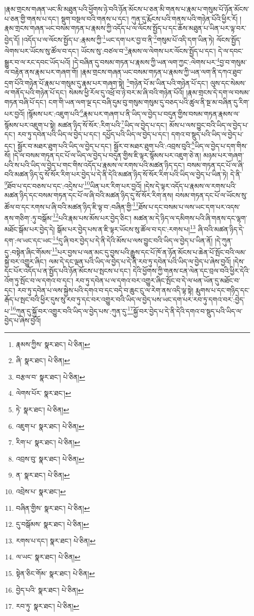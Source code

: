 །རྣམ་གྲངས་གཞན་ཡང་མི་མཐུན་པའི་ཕྱོགས་ཉེ་བའི་ཉོན་མོངས་པ་ཅན་མི་གནས་པ་རྣམ་པ་གསུམ་པོ་ཉོན་མོངས་པ་ཅན་གྱི་གནས་པ་དང་། སྡུག་བསྔལ་བའི་གནས་པ་དང་། ཀུན་དུ་རྨོངས་པའི་གནས་པའི་གཉེན་པོའི་ཕྱིར་རོ། །རྣམ་གྲངས་གཞན་ཡང་བསམ་གཏན་པ་རྣམས་ཀྱི་འདོད་པ་ལ་ལོངས་སྤྱོད་པ་དང་ཆོས་མཐུན་པ་ཡིན་པར་ལྟ་བར་བྱེད་དོ། །འདོད་པ་ལ་ལོངས་སྤྱོད་པ་:རྣམས་ཀྱི་\footnote{རྣམས་ཀྱིས་  སྣར་ཐང་།  པེ་ཅིན། }ཡང་དག་པར་བྱ་བ་ནི་\footnote{ཞི་  སྣར་ཐང་།  པེ་ཅིན། }གསུམ་པོ་འདི་དག་ཡིན་ཏེ། ལོངས་སྤྱོད་ལེགས་པར་ཡོངས་སུ་ཚོལ་བ་དང་། ཡོངས་སུ་:བཙལ་བ་\footnote{བརྩལ་བ་  སྣར་ཐང་།  པེ་ཅིན། }རྣམས་ལ་ལེགས་པར་ལོངས་སྤྱོད་པ་དང་། དེ་ལ་དབང་སྒྱུར་བ་ལ་རང་དབང་ཡོད་པའོ། །དེ་བཞིན་དུ་བསམ་གཏན་པ་རྣམས་ཀྱི་ཡན་ལག་ཀྱང་:ལེགས་པར་\footnote{ལེགས་པོར་  སྣར་ཐང་། }བྱ་བ་གསུམ་ལ་བརྟེན་ནས་རྣམ་པར་གཞག་གོ། །རྣམ་གྲངས་གཞན་ཡང་བསམ་གཏན་པ་རྣམས་ཀྱི་ཡན་ལག་ནི་དཀའ་ཐུབ་དྲག་པོའི་གཉེན་པོ་རྣམ་པ་གསུམ་དུ་རྣམ་པར་གཞག་སྟེ། \footnote{ཏེ་  སྣར་ཐང་།  པེ་ཅིན། }གཉེན་པོ་མ་ཡིན་པའི་གཉེན་པོ་དང་། ལུས་དང་སེམས་ལ་གནོད་པའི་གཉེན་པོ་དང་། སེམས་ཕྱི་རོལ་དུ་འཕྲོ་བ་ཉེ་བར་མ་ཞི་བའི་གཉེན་པོའོ། །རྣམ་གྲངས་དེ་དག་ལ་བསམ་གཏན་བཞི་པོ་དང་། ངག་གི་ཡན་ལག་ལྔ་དང་བཞི་དུམ་བུ་གསུམ་གསུམ་དུ་བཅད་པའི་ཚུལ་ནི་སྔ་མ་བཞིན་དུ་རིག་པར་བྱའོ། །སྙོམས་པར་:འཇུག་པའི་\footnote{འཇུག་པ་  སྣར་ཐང་།  པེ་ཅིན། }རྣམ་པར་གཞག་པ་ནི་ཡིད་ལ་བྱེད་པ་བདུན་གྱིས་བསམ་གཏན་རྣམས་ལ་སྙོམས་པར་འཇུག་པ་སྟེ། མཚན་ཉིད་སོ་སོར་:རིག་པའི་\footnote{རིག་པ་  སྣར་ཐང་།  པེ་ཅིན། }ཡིད་ལ་བྱེད་པ་དང་། མོས་པ་ལས་བྱུང་བའི་ཡིད་ལ་བྱེད་པ་དང་། རབ་ཏུ་དབེན་པའི་ཡིད་ལ་བྱེད་པ་དང་། དཔྱོད་པའི་ཡིད་ལ་བྱེད་པ་དང་། དགའ་བ་སྡུད་པའི་ཡིད་ལ་བྱེད་པ་དང་། སྦྱོར་བ་མཐར་ཐུག་པའི་ཡིད་ལ་བྱེད་པ་དང་། སྦྱོར་བ་མཐར་ཐུག་པའི་:འབྲས་བུའི་\footnote{འབྲས་བུ་  སྣར་ཐང་།  པེ་ཅིན། }ཡིད་ལ་བྱེད་པ་དག་གིས་སོ། །དེ་ལ་བསམ་གཏན་དང་པོ་ལ་ཡིད་ལ་བྱེད་པ་བདུན་གྱིས་ཇི་ལྟར་སྙོམས་པར་འཇུག་ཅེ་ན། མཉམ་པར་གཞག་པའི་ས་པའི་ཡིད་ལ་བྱེད་པ་གང་གིས་འདོད་པ་རྣམས་ལ་རགས་པའི་མཚན་ཉིད་དང་། བསམ་གཏན་དང་པོ་ལ་ཞི་བའི་མཚན་ཉིད་དུ་སོ་སོར་རིག་པར་བྱེད་པ་དེ་ནི་དེའི་མཚན་ཉིད་སོ་སོར་རིག་པའི་ཡིད་ལ་བྱེད་པ་ཡིན་ཏེ། དེ་ནི་\footnote{ན་  སྣར་ཐང་།  པེ་ཅིན། }ཐོབ་པ་དང་བཅས་པ་དང་:འདྲེས་པ་\footnote{འབྲེས་པ་  སྣར་ཐང་། }ཡིན་པར་རིག་པར་བྱའོ། །དེས་དེ་ལྟར་འདོད་པ་རྣམས་ལ་རགས་པའི་མཚན་ཉིད་དང་བསམ་གཏན་དང་པོ་ལ་ཞི་བའི་མཚན་ཉིད་དུ་སོ་སོར་རིག་ནས། བསམ་གཏན་དང་པོ་ལ་ཡོངས་སུ་ཚོལ་བ་དང་རགས་པ་ཞི་བའི་མཚན་ཉིད་ཇི་ལྟ་བ་:བཞིན་གྱི་\footnote{བཞིན་གྱིས་  སྣར་ཐང་།  པེ་ཅིན། }ཐོས་པ་དང་བསམ་པ་ལས་ཡང་དག་པར་འདས་ནས་གཅིག་:ཏུ་བསྒོམ་\footnote{དུ་བསྒོམས་  སྣར་ཐང་།  པེ་ཅིན། }པའི་རྣམ་པས་མོས་པར་བྱེད་ཅིང་། མཚན་མ་དེ་ཉིད་ལ་དམིགས་པའི་ཞི་གནས་དང་ལྷག་མཐོང་སྒོམ་པར་བྱེད་དེ། སྒོམ་པར་བྱེད་པས་ན་ཇི་ལྟར་ཡོངས་སུ་ཚོལ་བ་དང་:རགས་པ།\footnote{རགས་པ་དང་།  སྣར་ཐང་།  པེ་ཅིན། } ཞི་བའི་མཚན་ཉིད་དེ་དག་:ལ་ཡང་དང་ཡང་\footnote{ལ་ཡང་  སྣར་ཐང་།  པེ་ཅིན། }དུ་ཞི་བར་བྱེད་པ་དེ་ནི་དེའི་མོས་པ་ལས་བྱུང་བའི་ཡིད་ལ་བྱེད་པ་ཡིན་ནོ། །དེ་ཀུན་དུ་:བསྟེན་ཞིང་གོམས་\footnote{སྟེན་ཅིང་གོམ་  སྣར་ཐང་།  པེ་ཅིན། }པར་བྱས་པ་ལན་མང་དུ་བྱས་པའི་རྒྱུས་དང་པོ་ཁོ་ན་ཉོན་མོངས་པ་ཆེན་པོ་སྤོང་བའི་ལམ་སྐྱེ་བར་འགྱུར་ཞིང་། ལམ་དེ་དང་ལྡན་པའི་ཡིད་ལ་བྱེད་པ་དེ་ནི་རབ་ཏུ་དབེན་པའི་ཡིད་ལ་བྱེད་པ་ཞེས་བྱའོ། །དེས་དང་པོར་འདོད་པ་ན་སྤྱོད་པའི་ཉོན་མོངས་པ་སྤངས་པ་དང་། དེའི་ཕྱོགས་ཀྱི་གནས་ངན་ལེན་དང་བྲལ་བའི་ཕྱིར་དེའི་འོག་ཏུ་སྤོང་བ་ལ་དགའ་བ་དང་། རབ་ཏུ་དབེན་པ་ལ་དགའ་བར་འགྱུར་ཞིང་སྤོང་བ་དེ་ལ་ཕན་ཡོན་དུ་མཐོང་བ་དང་། རབ་ཏུ་དབེན་པ་ལས་སྐྱེས་པའི་དགའ་བ་དང་བདེ་བ་ཆུང་ངུ་ལ་རེག་ནས་འདི་ལྟ་སྟེ། རྨུགས་པ་དང་གཉིད་དང་རྒོད་པ་སྤང་བའི་ཕྱིར་དུས་སུ་རབ་ཏུ་དང་བར་འགྱུར་བའི་ཡིད་ལ་བྱེད་པས་ཡང་དག་པར་རབ་ཏུ་དགའ་བར་:བྱེད་པ་\footnote{བྱེད་པའི་  སྣར་ཐང་།  པེ་ཅིན། }ཀུན་དུ་སྐྱོ་བར་འགྱུར་བའི་ཡིད་ལ་བྱེད་པས་:ཀུན་དུ་\footnote{རབ་ཏུ་  སྣར་ཐང་།  པེ་ཅིན། }སྐྱོ་བར་བྱེད་པ་དེ་ནི་དེའི་དགའ་བ་སྡུད་པའི་ཡིད་ལ་བྱེད་པ་ཞེས་བྱའོ། 